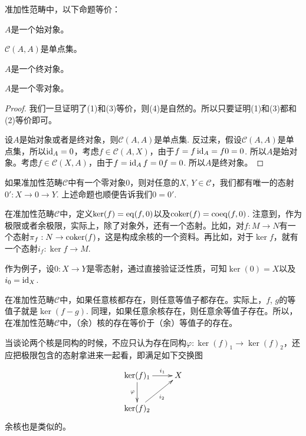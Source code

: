 \begin{pro}\label{zeroobj}
准加性范畴中，以下命题等价：
\begin{compactenum}[~~~(1)]
\item $A$是一个始对象。
\item $\mathcal{C}(A,A)$是单点集。
\item $A$是一个终对象。
\item $A$是一个零对象。
\end{compactenum}
\end{pro}

\begin{proof}
我们一旦证明了(1)和(3)等价，则(4)是自然的。所以只要证明(1)和(3)都和(2)等价即可。

设$A$是始对象或者是终对象，则$\mathcal{C}(A,A)$是单点集. 反过来，假设$\mathcal{C}(A,A)$是单点集，所以$\operatorname{id}_A=0$，考虑$f\in \mathcal{C}(A,X)$，由于$f=f\operatorname{id}_A=f0=0$. 所以$A$是始对象。考虑$f\in \mathcal{C}(X,A)$，由于$f=\operatorname{id}_A f=0f=0$. 所以$A$是终对象。
\end{proof}

如果准加性范畴$\mathcal{C}$中有一个零对象$0$，则对任意的$X$, $Y\in\mathcal{C}$，我们都有唯一的态射$0': X\to 0 \to Y$. 上述命题也顺便告诉我们$0=0'$. 

\begin{para}
在准加性范畴$\mathcal{C}$中，定义$\ker(f)=\operatorname{eq}(f,0)$以及$\operatorname{coker}(f)=\mathrm{coeq}(f,0)$. 注意到，作为极限或者余极限，实际上，除了对象外，还有一个态射。比如，对$f:M\to N$有一个态射$\pi_f:N\to \operatorname{coker}(f)$，这是构成余核的一个资料。再比如，对于$\ker f$，就有一个态射$i_f:\ker f\to M$. 

作为例子，设$0:X\to Y$是零态射，通过直接验证泛性质，可知$\ker(0)=X$以及$i_0=\operatorname{id}_X$.
\end{para}

\begin{para}
在准加性范畴$\mathcal{C}$中，如果任意核都存在，则任意等值子都存在。实际上，$f$, $g$的等值子就是$\ker(f-g)$. 同理，如果任意余核存在，则任意余等值子存在。所以，在准加性范畴$\mathcal{C}$中，（余）核的存在等价于（余）等值子的存在。
\end{para}

当谈论两个核是同构的时候，不应只认为存在同构$\varphi:\ker(f)_1\to \ker(f)_2$，还应把极限包含的态射拿进来一起看，即满足如下交换图
\[
\begin{xy}
	\xymatrix{
	\ker(f)_1\ar[d]_{\varphi}\ar[r]^-{i_1} &X\\
	\ker(f)_2\ar[ru]_{i_2}
	}
\end{xy}
\]
余核也是类似的。

